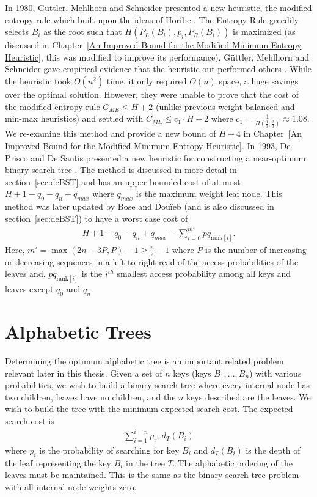 \documentclass[letterpaper,12pt,titlepage,oneside,final]{book}
\theoremstyle{plain}
\begin{document}
  In 1980, G{\"u}ttler, Mehlhorn and Schneider presented a new heuristic, the modified entropy rule \cite{guttler1980binary} which built upon the ideas of Horibe \cite{horibe1977improved}. The Entropy Rule greedily selects $B_i$ as the root such that $H(P_L(B_i), p_i, P_R(B_i))$ is maximized (as discussed in Chapter~\ref{An Improved Bound for the Modified Minimum Entropy Heuristic}, this was modified to improve its performance). G{\"u}ttler, Mehlhorn and Schneider gave empirical evidence that the heuristic out-performed others \cite{guttler1980binary}. While the heuristic took $O(n^2)$ time, it only required $O(n)$ space, a huge savings over the optimal solution. However, they were unable to prove that the cost of the modified entropy rule $C_{ME} \leq H+2$ (unlike previous weight-balanced and min-max heuristics) and settled with $C_{ME} \leq c_1\cdot H+2$ where $c_1=\frac{1}{H(\frac{1}{3}, \frac{2}{3})} \approx 1.08$. We re-examine this method and provide a new bound of $H+4$ in Chapter~\ref{An Improved Bound for the Modified Minimum Entropy Heuristic}. In 1993, De Prisco and De Santis presented a new heuristic for constructing a near-optimum binary search tree \cite{de1993binary}. The method is discussed in more detail in section~\ref{sec:deBST} and has an upper bounded cost of at most $H+1-q_0-q_n+q_{max}$ where $q_{max}$ is the maximum weight leaf node. This method was later updated by Bose and Dou\"{i}eb (and is also discussed in section~\ref{sec:deBST}) to have a worst case cost of 
\begin{align*}
H + 1 - q_0 - q_n + q_{max} - \sum_{i=0}^{m'} pq_{\text{rank}[i]}.
\end{align*}
Here, $m'=\max({2n-3P,P})-1 \geq \frac{n}{2} - 1$ where $P$ is the number of increasing or decreasing sequences in a left-to-right read of the access probabilities of the leaves and.  $pq_{\text{rank}[i]}$ is the $i^{th}$ smallest access probability among all keys and leaves except $q_0$ and $q_n$.

 
\section{Alphabetic Trees}

Determining the optimum alphabetic tree is an important related problem relevant later in this thesis. Given a set of $n$ keys (keys $B_1, ..., B_n$) with various probabilities, we wish to build a binary search tree where every internal node has two children, leaves have no children, and the $n$ keys described are the leaves. We wish to build the tree with the minimum expected search cost. The expected search cost is
\begin{align*}
\sum_{i=1}^{i=n} p_i \cdot d_T(B_i)
\end{align*}
where $p_i$ is the probability of searching for key $B_i$ and $d_T(B_i)$ is the depth of the leaf representing the key $B_i$ in the tree $T$. The alphabetic ordering of the leaves must be maintained. This is the same as the binary search tree problem with all internal node weights zero.
\end{document}
